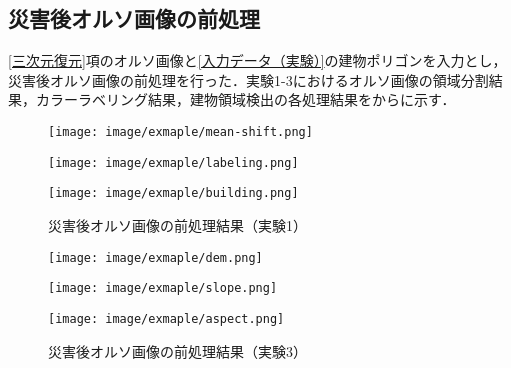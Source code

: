     \subsection{災害後オルソ画像の前処理}
      \label{災害後オルソ画像の前処理}
      \ref{三次元復元}項のオルソ画像と\ref{入力データ（実験）}の建物ポリゴンを入力とし，災害後オルソ画像の前処理を行った．実験1-3におけるオルソ画像の領域分割結果，カラーラベリング結果，建物領域検出の各処理結果をからに示す．

      \begin{figure}[t]
        \begin{minipage}[c]{0.329\hsize}
          \centering
          \texttt{[image: image/exmaple/mean-shift.png]}
        \end{minipage}
        \begin{minipage}[c]{0.329\hsize}
          \centering
          \texttt{[image: image/exmaple/labeling.png]}
        \end{minipage}
        \begin{minipage}[c]{0.329\hsize}
          \centering
          \texttt{[image: image/exmaple/building.png]}
        \end{minipage}
        \caption{災害後オルソ画像の前処理結果（実験1）}
        \label{災害後オルソ画像の前処理結果（実験1）}
      \end{figure}

      \begin{figure}[t]
        \begin{minipage}[c]{0.329\hsize}
          \centering
          \texttt{[image: image/exmaple/dem.png]}
        \end{minipage}
        \begin{minipage}[c]{0.329\hsize}
          \centering
          \texttt{[image: image/exmaple/slope.png]}
        \end{minipage}
        \begin{minipage}[c]{0.329\hsize}
          \centering
          \texttt{[image: image/exmaple/aspect.png]}
        \end{minipage}
        \caption{災害後オルソ画像の前処理結果（実験3）}      
      \end{figure}

